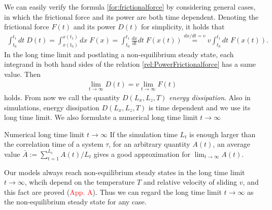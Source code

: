 We can easily verify the formula \eqref{for:frictionalforce} by considering general cases, in which the frictional force and its power are both time dependent. Denoting the frictional force $F(t)$ and its power $D(t)$ for simplicity, it holds that
\begin{align}
\int_{t_{0}}^{t_{1}}dt\;D(t)=\int_{x(t_{0})}^{x(t_{1})}dx\;F(x)=\int_{t_{0}}^{t_{1}}\frac{dx}{dt}dt\;F(x(t))\overset{dx/dt=v}{=}v\int_{t_{0}}^{t_{1}}dt\;F(x(t))\label{rel:PowerFrictionalforce}.
\end{align}
In the long time limit and postlating a non-equilibrium steady state, each integrand in both hand sides of the relation \eqref{rel:PowerFrictionalforce} has a same value. Then
\begin{align}
\lim_{t\to\infty}D(t)=v\lim_{t\to\infty}F(t)
\end{align}
holds. From now we call the quantity $D(L_{x}, L_{z}, T)$ \textit{energy dissipation}. Also in simulations, energy dissipation $D(L_{x}, L_{z}, T)$ is time dependent and we use its long time limit. We also formulate a numerical long time limit $t\to\infty$
\begin{itembox}{Numerical long time limit $t\to\infty$}
	If the simulation time $L_{t}$ is enough larger than the correlation time of a system $\tau$, for an arbitrary quantity $A(t)$, an average value $\bar{A}:=\sum_{t=1}^{L_{t}}A(t)/L_{t}$ gives a good approximation for $\lim_{t\to\infty}A(t)$.
\end{itembox}

Our models always reach non-equilibrium steady states  in the long time limit $t\to\infty$, whcih depend on the temperature $T$ and relative velocity of sliding $v$, and this fact are proved (\textcolor{red}{App. A}). Thus we can regard the long time limit $t\to\infty$ as the non-equilibrium steady state for any case.